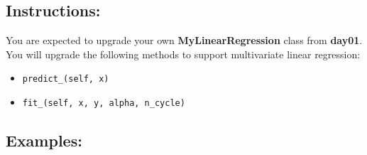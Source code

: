 \documentclass[]{article}
\begin{document}
\hypertarget{instructions}{%
\subsection{Instructions:}\label{instructions}}

You are expected to upgrade your own \textbf{MyLinearRegression} class
from \textbf{day01}. You will upgrade the following methods to support
multivariate linear regression:

\begin{itemize}
\item
  \texttt{predict\_(self,\ x)}
\item
  \texttt{fit\_(self,\ x,\ y,\ alpha,\ n\_cycle)}
\end{itemize}

\hypertarget{examples}{%
\subsection{Examples:}\label{examples}}
\end{document}
